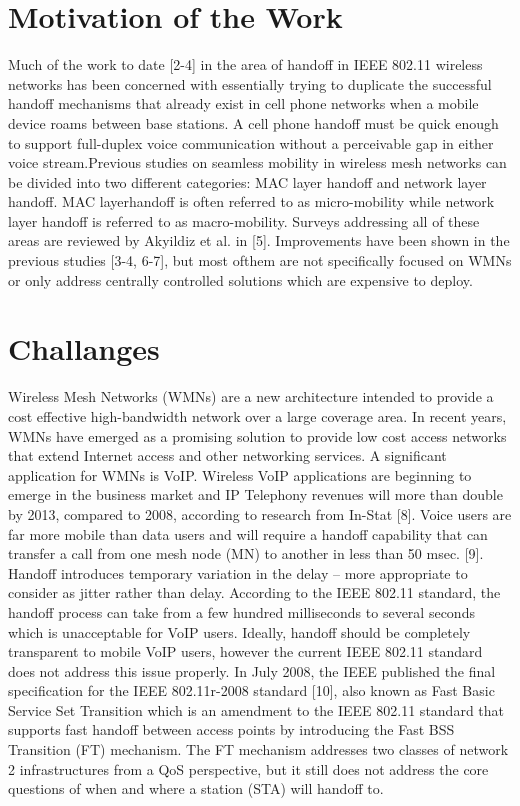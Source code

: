 \documentclass[12pt,a4paper]{report}
\begin{document}
\section{Motivation of the Work}
Much of the work to date [2-4] in the area of handoff in IEEE 802.11 wireless networks has been concerned with essentially trying to duplicate the successful handoff mechanisms that already exist in cell phone networks when a mobile device roams between base stations.  A cell phone handoff must be quick enough to support full-duplex voice communication without a perceivable gap in either voice stream.Previous studies on seamless mobility in wireless mesh networks can be divided into two different categories: MAC layer handoff and network layer handoff. MAC layerhandoff is often referred to as micro-mobility while network layer handoff is referred to as macro-mobility. Surveys addressing all of these areas are reviewed by Akyildiz et al. in [5]. Improvements have been shown in the previous studies [3-4, 6-7], but most ofthem are not specifically focused on WMNs or only address centrally controlled solutions which are expensive to deploy.
\section{Challanges}
Wireless Mesh Networks (WMNs) are a new architecture intended to provide a cost effective high-bandwidth network over a large coverage area. In recent years, WMNs have emerged as a promising solution to provide low cost access networks that extend Internet access and other networking services. A significant application for WMNs is VoIP. Wireless VoIP applications are beginning to emerge in the business market and IP Telephony revenues will more than double by 2013, compared to 2008, according to research from In-Stat [8]. Voice users are far more mobile than data users and will require a handoff capability that can transfer a call from one mesh node (MN) to another in less than 50 msec. [9]. Handoff introduces temporary variation in the delay – more appropriate to consider as jitter rather than delay. According to the IEEE 802.11 standard, the handoff process can take from a few hundred milliseconds to several seconds which is unacceptable for VoIP users. Ideally, handoff should be completely transparent to mobile VoIP users, however the current IEEE 802.11 standard does not address this issue properly. In July 2008, the IEEE published the final specification for the IEEE 802.11r-2008 standard [10], also known as Fast Basic Service Set Transition which is an amendment to the IEEE 802.11 standard that supports fast handoff between access points by introducing the Fast BSS Transition (FT) mechanism. The FT mechanism addresses two classes of network 2 infrastructures from a QoS perspective, but it still does not address the core questions of when and where a station (STA) will handoff to.
\end{document}
